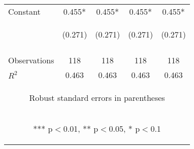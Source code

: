 \begin{center}
\begin{tabular}{lcccc}
Constant & 0.455* & 0.455* & 0.455* & 0.455* \\
 & \begin{footnotesize}(0.271)\end{footnotesize} & \begin{footnotesize}(0.271)\end{footnotesize} & \begin{footnotesize}(0.271)\end{footnotesize} & \begin{footnotesize}(0.271)\end{footnotesize} \\
\vspace{4pt} & \begin{footnotesize}\end{footnotesize} & \begin{footnotesize}\end{footnotesize} & \begin{footnotesize}\end{footnotesize} & \begin{footnotesize}\end{footnotesize} \\
Observations & 118 & 118 & 118 & 118 \\
 $R^2$ & 0.463 & 0.463 & 0.463 & 0.463 \\ \hline
\multicolumn{5}{c}{\begin{footnotesize} Robust standard errors in parentheses\end{footnotesize}} \\
\multicolumn{5}{c}{\begin{footnotesize} *** p$<$0.01, ** p$<$0.05, * p$<$0.1\end{footnotesize}} \\
\end{tabular}
\end{center}
